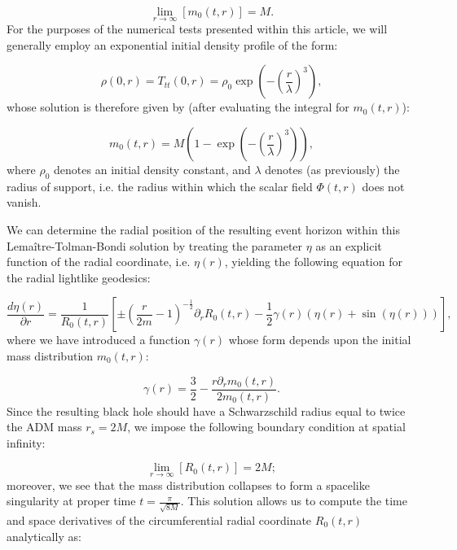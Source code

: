 \documentclass{article}
\begin{document}
\begin{equation}
\lim_{r \to \infty} \left[ m_0 \left( t, r \right) \right] = M.
\end{equation}
For the purposes of the numerical tests presented within this article, we will generally employ an exponential initial density profile of the form:

\begin{equation}
\rho \left( 0, r \right) = T_{t t} \left( 0, r \right) = \rho_0 \exp \left( - \left( \frac{r}{\lambda} \right)^3 \right),
\end{equation}
whose solution is therefore given by (after evaluating the integral for ${m_0 \left( t, r \right)}$):

\begin{equation}
m_0 \left( t, r \right) = M \left( 1 - \exp \left( - \left( \frac{r}{\lambda} \right)^3 \right) \right),
\end{equation}
where ${\rho_0}$ denotes an initial density constant, and ${\lambda}$ denotes (as previously) the radius of support, i.e. the radius within which the scalar field ${\Phi \left( t, r \right)}$ does not vanish.

We can determine the radial position of the resulting event horizon within this Lema\^itre-Tolman-Bondi solution by treating the parameter ${\eta}$ as an explicit function of the radial coordinate, i.e. ${\eta \left( r \right)}$, yielding the following equation for the radial lightlike geodesics:

\begin{equation}
\frac{d \eta \left( r \right)}{\partial r} = \frac{1}{R_0 \left( t, r \right)} \left[ \pm \left( \frac{r}{2m} - 1 \right)^{- \frac{1}{2}} \partial_r R_0 \left( t, r \right) - \frac{1}{2} \gamma \left( r \right) \left( \eta \left( r \right) + \sin \left( \eta \left( r \right) \right) \right) \right],
\end{equation}
where we have introduced a function ${\gamma \left( r \right)}$ whose form depends upon the initial mass distribution ${m_0 \left( t, r \right)}$:

\begin{equation}
\gamma \left( r \right) = \frac{3}{2} - \frac{r \partial_r m_0 \left( t, r \right)}{2 m_0 \left( t, r \right)}.
\end{equation}
Since the resulting black hole should have a Schwarzschild radius equal to twice the ADM mass ${r_s = 2M}$, we impose the following boundary condition at spatial infinity:

\begin{equation}
\lim_{r \to \infty} \left[ R_0 \left( t, r \right) \right] = 2M;
\end{equation}
moreover, we see that the mass distribution collapses to form a spacelike singularity at proper time ${t = \frac{\pi}{\sqrt{8 M}}}$. This solution allows us to compute the time and space derivatives of the circumferential radial coordinate ${R_0 \left( t, r \right)}$ analytically as:
\end{document}

